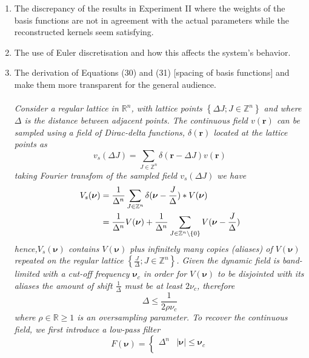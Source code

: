 \documentclass{article}
\begin{document}
    \begin{enumerate}
        \item The discrepancy of the results in Experiment II where the weights of the basis functions are not in agreement with the actual parameters while the reconstructed kernels seem satisfying.
        \item The use of Euler discretisation and how this affects the system's behavior.
        \item The derivation of Equations (30) and (31) [spacing of basis functions] and make them more transparent for the general audience.\\ \\
\emph{Consider a regular lattice in $\mathbb R^n$, with lattice points $\left\lbrace \Delta J; J\in \mathbb Z^n\right\rbrace$ and where $\Delta$ is the distance between adjacent points. The continuous field $v(\mathbf r)$ can be sampled using a field of Dirac-delta functions, $\delta(\mathbf r)$ located at the lattice points as
\begin{equation}
 v_s(\Delta J)=\sum_{J \in \mathbb Z^n}\delta(\mathbf r-\Delta J)v(\mathbf r)
\end{equation}
taking Fourier transfom of the sampled field $v_s(\Delta J)$ we have
\begin{align}
 V_s(\boldsymbol{\nu})&=\frac{1}{\Delta^n}\sum_{J\in\mathbb Z^n}\delta(\boldsymbol{\nu}-\frac{J}{\Delta})\ast V(\boldsymbol\nu)\\
&=\frac{1}{\Delta^n}V(\boldsymbol\nu)+\frac{1}{\Delta^n}\sum_{J\in\mathbb Z^n\setminus \mathbf \{0\}}V(\boldsymbol{\nu}-\frac{J}{\Delta})
\end{align}
hence,$V_s(\boldsymbol{\nu})$ contains $V(\boldsymbol\nu)$ plus infinitely many copies (aliases) of  $V(\boldsymbol\nu)$ repeated on the regular lattice $\left\lbrace \frac{J}{\Delta}; J\in \mathbb Z^n\right\rbrace$. Given the dynamic field is band-limited with a cut-off frequency $\boldsymbol\nu_c$ in order for $V(\boldsymbol\nu)$ to be disjointed with its aliases the amount of shift $\frac{1}{\Delta}$ must be at least $2\nu_c$, therefore
\begin{equation}\label{ap:Shannon}
 \Delta\le\frac{1}{2\rho\nu_c}
\end{equation}
where $\rho \in \mathbb{R} \ge 1$ is an oversampling parameter. To recover the continuous field, we first introduce a low-pass filter \begin{equation}
F(\boldsymbol \nu)=\begin{cases}
  \Delta^n & |\boldsymbol\nu|\le \boldsymbol\nu_c \\

\end{cases}
\end{equation}}
\end{enumerate}
\end{document}
